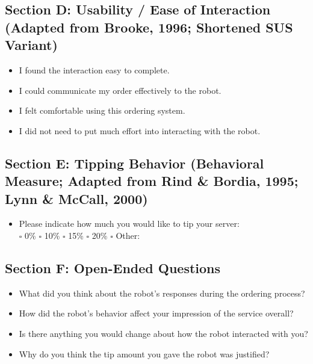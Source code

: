 \documentclass[conference]{IEEEtran}
\begin{document}
\subsection{Section D: Usability / Ease of Interaction (Adapted from Brooke, 1996; Shortened SUS Variant)}
\begin{itemize}
\item I found the interaction easy to complete.
\item I could communicate my order effectively to the robot.
\item I felt comfortable using this ordering system.
\item I did not need to put much effort into interacting with the robot.
\end{itemize}

\subsection{Section E: Tipping Behavior (Behavioral Measure; Adapted from Rind \& Bordia, 1995; Lynn \& McCall, 2000)}
\begin{itemize}
\item Please indicate how much you would like to tip your server: \\
$\square$ 0\% \quad $\square$ 10\% \quad $\square$ 15\% \quad $\square$ 20\% \quad $\square$ Other: \underline{\hspace{1.8cm}}
\end{itemize}


\subsection{Section F: Open-Ended Questions}
\begin{itemize}
\item What did you think about the robot’s responses during the ordering process?
\item How did the robot’s behavior affect your impression of the service overall?
\item Is there anything you would change about how the robot interacted with you?
\item Why do you think the tip amount you gave the robot was justified?
\end{itemize}
\end{document}
